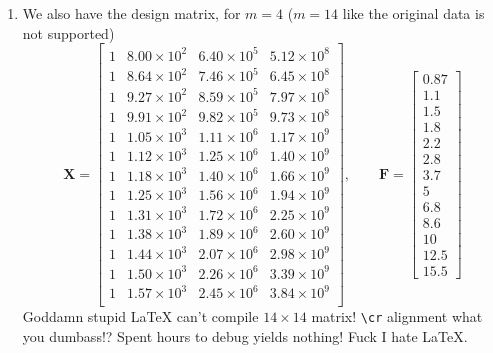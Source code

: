 \documentclass[../../../main.tex]{subfiles}
\begin{document}
\begin{enumerate}
    \item We also have the design matrix, for $m=4$ ($m=14$ like the original data is not supported)
          \begin{equation*}
              \mathbf{X}=
              \begin{bmatrix}
                  1 & 8.00\times 10^{2} & 6.40\times 10^{5} & 5.12\times 10^{8} \\
                  1 & 8.64\times 10^{2} & 7.46\times 10^{5} & 6.45\times 10^{8} \\
                  1 & 9.27\times 10^{2} & 8.59\times 10^{5} & 7.97\times 10^{8} \\
                  1 & 9.91\times 10^{2} & 9.82\times 10^{5} & 9.73\times 10^{8} \\
                  1 & 1.05\times 10^{3} & 1.11\times 10^{6} & 1.17\times 10^{9} \\
                  1 & 1.12\times 10^{3} & 1.25\times 10^{6} & 1.40\times 10^{9} \\
                  1 & 1.18\times 10^{3} & 1.40\times 10^{6} & 1.66\times 10^{9} \\
                  1 & 1.25\times 10^{3} & 1.56\times 10^{6} & 1.94\times 10^{9} \\
                  1 & 1.31\times 10^{3} & 1.72\times 10^{6} & 2.25\times 10^{9} \\
                  1 & 1.38\times 10^{3} & 1.89\times 10^{6} & 2.60\times 10^{9} \\
                  1 & 1.44\times 10^{3} & 2.07\times 10^{6} & 2.98\times 10^{9} \\
                  1 & 1.50\times 10^{3} & 2.26\times 10^{6} & 3.39\times 10^{9} \\
                  1 & 1.57\times 10^{3} & 2.45\times 10^{6} & 3.84\times 10^{9} \\
              \end{bmatrix},
              \qquad
              \mathbf{F}=
              \begin{bmatrix}
                  0.87 \\ 1.1 \\ 1.5 \\ 1.8 \\ 2.2 \\ 2.8 \\ 3.7 \\ 5 \\ 6.8 \\ 8.6 \\ 10 \\ 12.5 \\ 15.5
              \end{bmatrix}
          \end{equation*}
          Goddamn stupid {\LaTeX}  can't compile $14 \times 14$ matrix! \verb|\cr| alignment what you dumbass!? Spent hours to debug yields nothing! Fuck I hate \LaTeX.


\end{enumerate}
\end{document}
